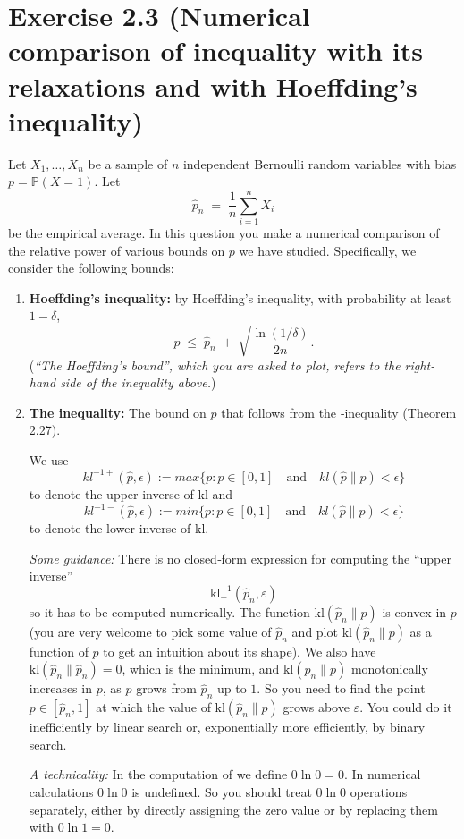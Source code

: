 \documentclass[12pt]{article}
\newcommand{\kl}{\mathrm{kl}}
\begin{document}
\section*{Exercise 2.3 (Numerical comparison of \kl{} inequality with its relaxations and with Hoeffding’s inequality)}

Let $X_1,\dots,X_n$ be a sample of $n$ independent Bernoulli random variables with bias $p=\mathbb P(X=1)$.  Let
\[
  \hat p_n \;=\;\frac1n\sum_{i=1}^n X_i
\]
be the empirical average.  In this question you make a numerical comparison of the relative power of various bounds on $p$ we have studied.  Specifically, we consider the following bounds:

\begin{enumerate}[label=\textbf{\Alph*.}]

\item \textbf{Hoeffding’s inequality:} by Hoeffding’s inequality, with probability at least $1-\delta$,
\[
  p \;\le\; \hat p_n \;+\;\sqrt{\frac{\ln(1/\delta)}{2n}}.
\]
(\emph{“The Hoeffding’s bound”, which you are asked to plot, refers to the right‐hand side of the inequality above.})

\item \textbf{The \kl{} inequality:} The bound on $p$ that follows from the \kl{}‐inequality (Theorem 2.27).

We use 
\[
kl^{−1+}(\hat p, \epsilon) := max \{ p : p \in [0, 1]  \quad \textrm{and}\quad kl(\hat p \| p) < \epsilon \}   
\]
to denote
the upper inverse of kl and 
\[
kl^{−1-}(\hat p, \epsilon) := min \{ p : p \in [0, 1]  \quad \textrm{and}\quad kl(\hat p \| p) < \epsilon \}  
\]
to denote the lower inverse
of kl.


\emph{Some guidance:} There is no closed‐form expression for computing the “upper inverse” 
\[
   \kl^{-1}_{+}(\hat p_n,\varepsilon)
\]
so it has to be computed numerically.  The function $\kl(\hat p_n\|p)$ is convex in $p$ (you are very welcome to pick some value of $\hat p_n$ and plot $\kl(\hat p_n\|p)$ as a function of $p$ to get an intuition about its shape).  We also have $\kl(\hat p_n\|\hat p_n)=0$, which is the minimum, and $\kl(\hat p_n\|p)$ monotonically increases in $p$, as $p$ grows from $\hat p_n$ up to $1$.  So you need to find the point $p\in[\hat p_n,1]$ at which the value of $\kl(\hat p_n\|p)$ grows above $\varepsilon$.  You could do it inefficiently by linear search or, exponentially more efficiently, by binary search.

\emph{A technicality:} In the computation of \kl{} we define $0\ln0=0$.  In numerical calculations $0\ln0$ is undefined.  So you should treat $0\ln0$ operations separately, either by directly assigning the zero value or by replacing them with $0\ln1=0$.


\end{enumerate}
\end{document}
